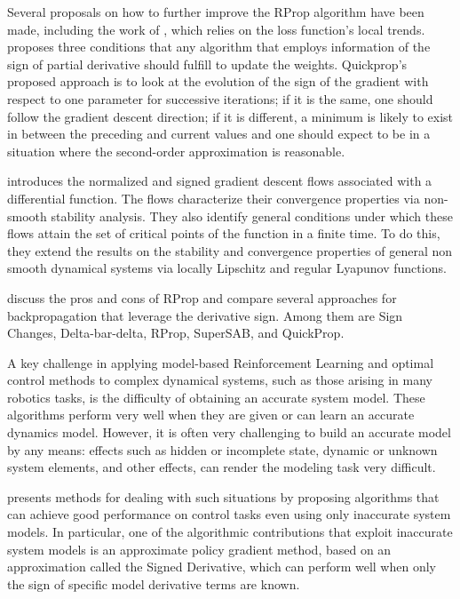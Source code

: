\documentclass[11pt]{book}
\begin{document}
Several proposals on how to further improve the RProp algorithm have
been made, including the work of \cite{igel2003empirical}, which
relies on the loss function's local trends.\cite{anastasiadis2003efficient}
proposes three conditions that any algorithm that employs information
of the sign of partial derivative should fulfill to update the weights.
Quickprop's proposed approach \cite{roux2005optimization} is to
look at the evolution of the sign of the gradient with respect to
one parameter for successive iterations; if it is the same, one should
follow the gradient descent direction; if it is different, a minimum
is likely to exist in between the preceding and current values and
one should expect to be in a situation where the second-order approximation
is reasonable.

\cite{cortes2005achieving} introduces the normalized and signed gradient
descent flows associated with a differential function. The flows characterize
their convergence properties via non-smooth stability analysis. They
also identify general conditions under which these flows attain the
set of critical points of the function in a finite time. To do this,
they extend the results on the stability and convergence properties
of general non smooth dynamical systems via locally Lipschitz and
regular Lyapunov functions.

\cite{zainuddin2005improving,prasad2013comparison,mushgil2015comparison}
discuss the pros and cons of RProp and compare several approaches
for backpropagation that leverage the derivative sign. Among them
are \textquotedbl Sign Changes,\textquotedbl{} \textquotedbl Delta-bar-delta,\textquotedbl{}
\textquotedbl RProp,\textquotedbl{} \textquotedbl SuperSAB,\textquotedbl{}
and \textquotedbl QuickProp.\textquotedbl{}

A key challenge in applying model-based Reinforcement Learning and
optimal control methods to complex dynamical systems, such as those
arising in many robotics tasks, is the difficulty of obtaining an
accurate system model. These algorithms perform very well when they
are given or can learn an accurate dynamics model. However, it is
often very challenging to build an accurate model by any means: effects
such as hidden or incomplete state, dynamic or unknown system elements,
and other effects, can render the modeling task very difficult.

\cite{kolter2010learning} presents methods for dealing with such
situations by proposing algorithms that can achieve good performance
on control tasks even using only inaccurate system models. In particular,
one of the algorithmic contributions that exploit inaccurate system
models is an approximate policy gradient method, based on an approximation
called the Signed Derivative, which can perform well when only the
sign of specific model derivative terms are known. 
\end{document}
